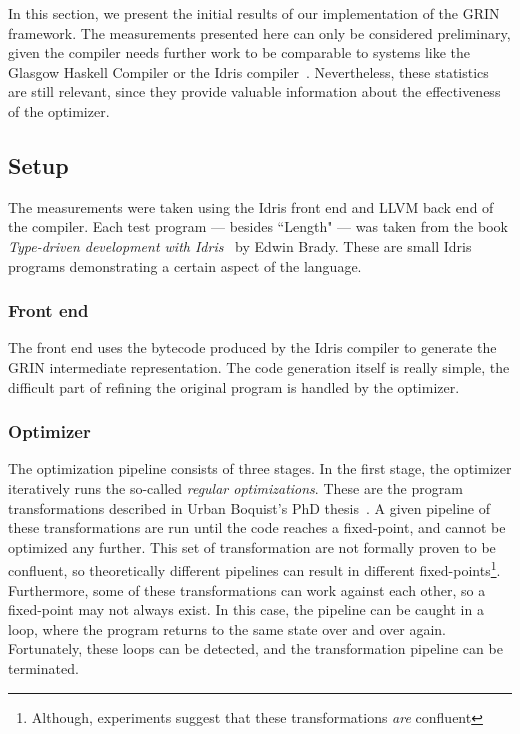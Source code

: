 \documentclass[main.tex]{subfiles}
\begin{document}
	
	In this section, we present the initial results of our implementation of the GRIN framework. The measurements presented here can only be considered preliminary, given the compiler needs further work to be comparable to systems like the Glasgow Haskell Compiler or the Idris compiler~\cite{idris}. Nevertheless, these statistics are still relevant, since they provide valuable information about the effectiveness of the optimizer.
	
	\subsection{Setup}
	
	The measurements were taken using the Idris front end and LLVM back end of the compiler. Each test program --- besides ``Length" --- was taken from the book \textit{Type-driven development with Idris}~\cite{tdd-idris} by Edwin Brady. These are small Idris programs demonstrating a certain aspect of the language. 
	
	\subsubsection{Front end}
	
	The front end uses the bytecode produced by the Idris compiler to generate the GRIN intermediate representation. The code generation itself is really simple, the difficult part of refining the original program is handled by the optimizer. 
	
	\subsubsection{Optimizer}
	
	The optimization pipeline consists of three stages. In the first stage, the optimizer iteratively runs the so-called \textit{regular optimizations}. These are the program transformations described in Urban Boquist's PhD thesis~\cite{boquist-phd}. A given pipeline of these transformations are run until the code reaches a fixed-point, and cannot be optimized any further. This set of transformation are not formally proven to be confluent, so theoretically different pipelines can result in different fixed-points\footnote{Although, experiments suggest that these transformations \textit{are} confluent}. Furthermore, some of these transformations can work against each other, so a fixed-point may not always exist. In this case, the pipeline can be caught in a loop, where the program returns to the same state over and over again. Fortunately, these loops can be detected, and the transformation pipeline can be terminated. 
	
\end{document}
